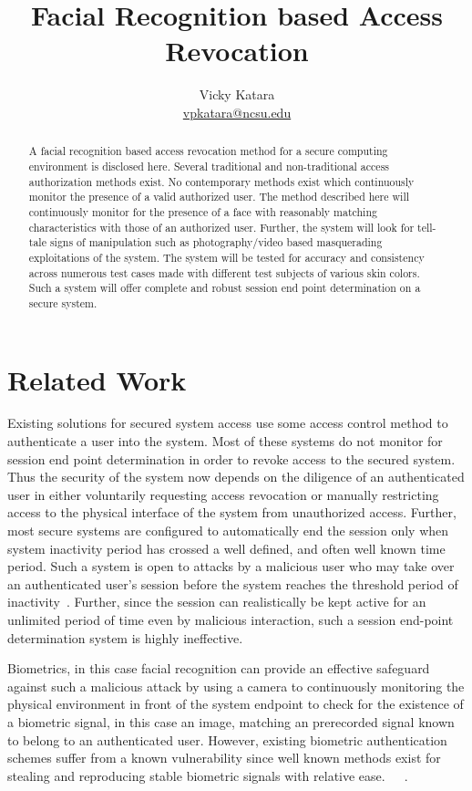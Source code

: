 \documentclass[10pt,twocolumn,pdftex]{article}
\title{Facial Recognition based Access Revocation}
\author{Vicky Katara \\
\url{vpkatara@ncsu.edu}}
\date{}
\begin{document}
\maketitle

\begin{abstract}
A facial recognition based access revocation method for a secure computing environment is disclosed here. Several traditional and non-traditional access authorization methods exist. No contemporary methods exist which continuously monitor the presence of a valid authorized user. The method described here will continuously monitor for the presence of a face with reasonably matching characteristics with those of an authorized user. Further, the system will look for tell-tale signs of manipulation such as photography/video based masquerading exploitations of the system. The system will be tested for accuracy and consistency across numerous test cases made with different test subjects of various skin colors. Such a system will offer complete and robust session end point determination on a secure system.  
\end{abstract}

\newpage
\hspace{1em}
\newpage

\section{Related Work}

Existing solutions for secured system access use some access control method to authenticate a user into the system. Most of these systems do not monitor for session end point determination in order to revoke access to the secured system. Thus the security of the system now depends on the diligence of an authenticated user in either voluntarily requesting access revocation or manually restricting access to the physical interface of the system from unauthorized access. Further, most secure systems are configured to automatically end the session only when system inactivity period has crossed a well defined, and often well known time period. Such a system is open to attacks by a malicious user who may take over an authenticated user's session before the system reaches the threshold period of inactivity~\cite{xue05}. Further, since the session can realistically be kept active for an unlimited period of time even by malicious interaction, such a session end-point determination system is highly ineffective.

Biometrics, in this case facial recognition can provide an effective safeguard against such a malicious attack by using a camera to continuously monitoring the physical environment in front of the system endpoint to check for the existence of a biometric signal, in this case an image, matching an prerecorded signal known to belong to an authenticated user. However, existing biometric authentication schemes suffer from a known vulnerability since well known methods exist for stealing and reproducing stable biometric signals with relative ease.~\cite{log03}~\cite{qin05}~\cite{uus04}. %
\end{document}
